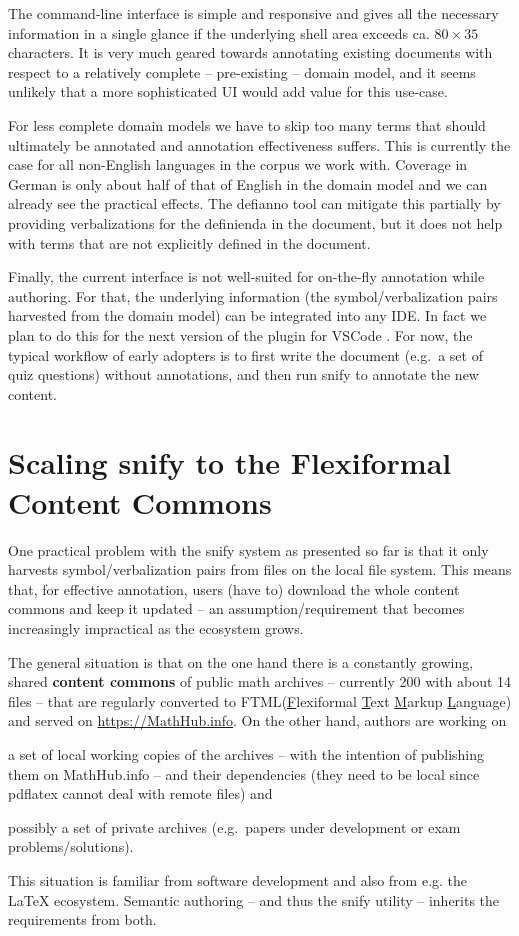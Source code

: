 \documentclass[runningheads]{llncs}
\newcommand\snify{\textsf{snify}\xspace}
\newcommand\defianno{\textsf{defianno}\xspace}
\newcommand\FTML{\textsf{FTML}\xspace}
\begin{document}
The command-line interface is simple and responsive and gives all the necessary
information in a single glance if the underlying shell area exceeds ca. $80\times 35$
characters. It is very much geared towards annotating existing documents with respect to a
relatively complete -- pre-existing -- domain model, and it seems unlikely that a more
sophisticated UI would add value for this use-case.

For less complete domain models we have to skip too many terms that should ultimately be
annotated and annotation effectiveness suffers. This is currently the case for all
non-English languages in the \sTeX corpus we work with. Coverage in German is only about
half of that of English in the domain model and we can already see the practical effects.  The \defianno tool
can mitigate this partially by providing verbalizations for
the definienda in the document, but it does not help with terms that are not explicitly
defined in the document.

Finally, the current interface is not well-suited for on-the-fly annotation while
authoring.
For that, the underlying information (the symbol/verbalization pairs harvested
from the domain model) can be integrated into any IDE. In fact we plan to do this for the
next version of the \sTeX plugin for VSCode \cite{sTeX-IDE:git}.
For now, the typical workflow of early adopters is to first write the document (e.g.\ a set of quiz questions) without annotations, and then run \snify to annotate the new content.

\section{Scaling \snify to the Flexiformal Content Commons }\label{sec:scaling}
One practical problem with the \snify system as presented so far is that it only harvests
symbol/verbalization pairs from \sTeX files on the local file system. This means that, for
effective annotation, users (have to) download the whole content commons and keep it
updated -- an assumption/requirement that becomes increasingly impractical as the \sTeX
ecosystem grows.

The general situation is that on the one hand there is a constantly growing, shared
\textbf{content commons} of public math archives -- currently 200 with about 14 \sTeX
files -- that are regularly converted to \FTML (\underline{F}lexiformal \underline{T}ext
\underline{M}arkup \underline{L}anguage) and served on \url{https://MathHub.info}. On the
other hand, authors are working on
\begin{compactenum}[\em i\rm)]
\item a set of local working copies of the archives -- with the intention of publishing
  them on MathHub.info -- and their dependencies (they need to be local since
  \textsf{pdflatex} cannot deal with remote files) and
\item possibly a set of private archives (e.g.\ papers under development or exam
  problems/solutions).
\end{compactenum}
This situation is familiar from software development and also from e.g. the \LaTeX{}
ecosystem. Semantic authoring -- and thus the \snify utility -- inherits the requirements
from both.
\end{document}
